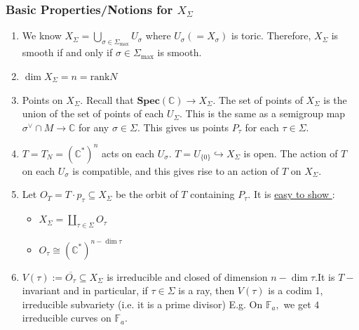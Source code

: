 \documentclass[a4paper,12pt]{amsart}
\newcommand{\C}{\ensuremath{\mathbb{C}}}
\begin{document}
\subsubsection*{Basic Properties/Notions for $X_\Sigma$}
\begin{enumerate}
	\item We know $X_\Sigma=\bigcup_{\sigma\in \Sigma_{\max}} U_\sigma$ where $U_\sigma(=X_\sigma)$ is toric. Therefore, $X_\Sigma$ is smooth if and only if $\sigma\in \Sigma_{\max}$ is smooth.  
	\item $\dim X_\Sigma=n=\text{rank} N$
	\item Points on $X_\Sigma.$ Recall that $\textbf{Spec}(\C)\to X_\Sigma.$ The set of points of $X_\Sigma$ is the union of the set of points of each $U_\Sigma$.  This is the same as a semigroup map $\sigma^\vee\cap M\to \C$ for any $\sigma\in \Sigma.$
	This gives us points $P_\tau$ for each $\tau \in \Sigma.$ 
	\item $T=T_N=(\C^*)^n$ acts on each $U_\sigma.$ $T=U_{\{0\}}\hookrightarrow X_\Sigma$ is open. The action of $T$ on each $U_\sigma$ is compatible, and this gives rise to an action of $T$ on $X_\Sigma.$
	\item Let $O_T=T\cdot p_\tau\subseteq X_\Sigma$ be the orbit of $T$ containing $P_\tau.$ It is \underline{easy to show }: 
	\begin{itemize}
			\item $X_\Sigma=\coprod_{\tau\in \Sigma} O_\tau$
			\item $O_\tau\cong (\C^*)^{n-\dim \tau}$
\end{itemize}	 
	\item  $V(\tau):=\overline{O_\tau}\subseteq X_\Sigma$ is irreducible and closed of dimension $n-\dim \tau.$It is $T-$invariant and in particular, if $\tau\in \Sigma$ is a ray, then $V(\tau)$ is a codim 1, irreducible subvariety (i.e. it is a prime divisor) E.g. On $\mathbb{F}_a,$ we get $4$ irreducible curves on $\mathbb{F}_a.$    
\end{enumerate}
\end{document}
